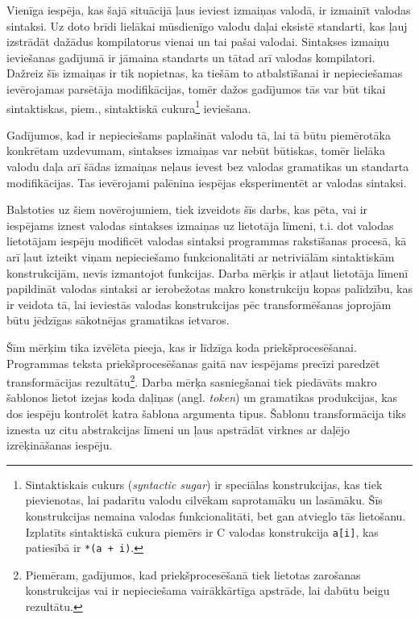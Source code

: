 Vienīga iespēja, kas šajā situācijā ļaus ieviest izmaiņas valodā, ir izmainīt valodas sintaksi. Uz doto brīdi lielākai mūsdienīgo valodu daļai eksistē standarti, kas ļauj izstrādāt dažādus kompilatorus vienai un tai pašai valodai. Sintakses izmaiņu ieviešanas gadījumā ir jāmaina standarts un tātad arī valodas kompilatori. Dažreiz šīs izmaiņas ir tik nopietnas, ka tiešām to atbalstīšanai ir nepieciešamas ievērojamas parsētāja modifikācijas, tomēr dažos gadījumos tās var būt tikai sintaktiskas, piem., sintaktiskā cukura\footnote{Sintaktiskais cukurs (\emph{syntactic sugar}) ir speciālas konstrukcijas, kas tiek pievienotas, lai padarītu valodu cilvēkam saprotamāku un lasāmāku. Šīs konstrukcijas nemaina valodas funkcionalitāti, bet gan atvieglo tās lietošanu. Izplatīts sintaktiskā cukura piemērs ir C valodas konstrukcija \texttt{a[i]}, kas patiesībā ir \texttt{*(a + i)}.} ieviešana.

Gadījumos, kad ir nepieciešams paplašināt valodu tā, lai tā būtu piemērotāka konkrētam uzdevumam, sintakses izmaiņas var nebūt būtiskas, tomēr lielāka valodu daļa arī šādas izmaiņas neļaus ievest bez valodas gramatikas un standarta modifikācijas. Tas ievērojami palēnina iespējas eksperimentēt ar valodas sintaksi.

Balstoties uz šiem novērojumiem, tiek izveidots šīs darbs, kas pēta, vai ir iespējams iznest valodas sintakses izmaiņas uz lietotāja līmeni, t.i. dot valodas lietotājam iespēju modificēt valodas sintaksi programmas rakstīšanas procesā, kā arī ļaut izteikt viņam nepieciešamo funkcionalitāti ar netriviālām sintaktiskām konstrukcijām, nevis izmantojot funkcijas. Darba mērķis ir atļaut lietotāja līmenī papildināt valodas sintaksi ar ierobežotas makro konstrukciju kopas palīdzību, kas ir veidota tā, lai ieviestās valodas konstrukcijas pēc transformēšanas joprojām būtu jēdzīgas sākotnējas gramatikas ietvaros.

Šīm mērķim tika izvēlēta pieeja, kas ir līdzīga koda priekšprocesēšanai. Programmas teksta priekšprocesēšanas gaitā nav iespējams precīzi paredzēt transformācijas rezultātu\footnote{Piemēram, gadījumos, kad priekšprocesēšanā tiek lietotas zarošanas konstrukcijas vai ir nepieciešama vairākkārtīga apstrāde, lai dabūtu beigu rezultātu.}. Darba mērķa sasniegšanai tiek piedāvāts makro šablonos lietot izejas koda daļiņas (angl. \emph{token}) un gramatikas produkcijas, kas dos iespēju kontrolēt katra šablona argumenta tipus. Šablonu transformācija tiks iznesta uz citu abstrakcijas līmeni un ļaus apstrādāt virknes ar daļējo izrēķināšanas iespēju.

